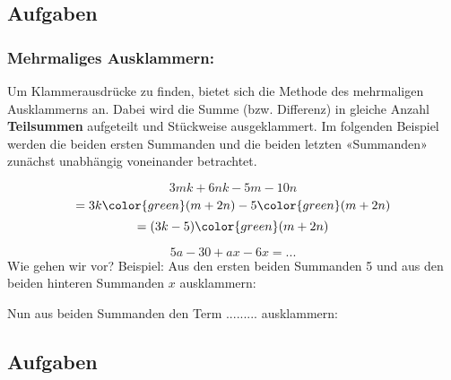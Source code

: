



\subsection*{Aufgaben}


\platzFuerBerechnungenBisEndeSeite{}
\newpage



\subsubsection{Mehrmaliges Ausklammern:}
 Um Klammerausdrücke zu finden, bietet sich die Methode des mehrmaligen Ausklammerns an.
 Dabei wird die Summe (bzw. Differenz) in gleiche Anzahl \textbf{Teilsummen} aufgeteilt und Stückweise ausgeklammert.
 Im folgenden Beispiel werden die beiden ersten Summanden und die beiden letzten «Summanden» zunächst unabhängig voneinander betrachtet.

$$3mk+6nk-5m-10n $$
$$= 3k{\color{green}(m+2n)}-5{\color{green}(m+2n)} $$
$$= (3k-5){\color{green}(m+2n)}$$


\begin{beispiel}{}{}
  $$5a-30+ax-6x = ...$$
  Wie gehen wir vor? Beispiel: Aus den ersten beiden Summanden 5 und
  aus den beiden hinteren Summanden $x$ ausklammern:


  Nun aus beiden Summanden den Term ......... 
  ausklammern:

\end{beispiel}

\subsection*{Aufgaben}
\platzFuerBerechnungenBisEndeSeite{}
\newpage


